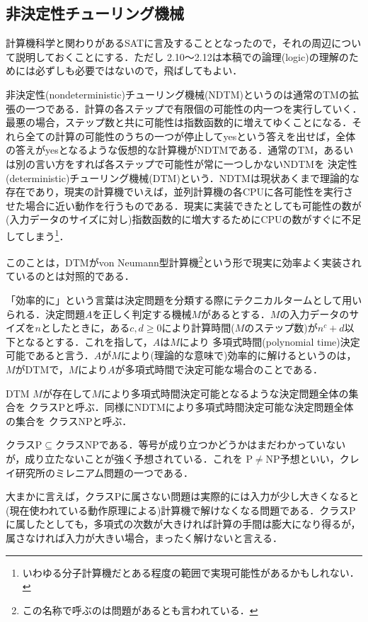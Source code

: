 \documentclass{ltjsarticle}
\theoremstyle{mystyle1}
\theoremstyle{mystyle3}
\theoremstyle{mystyle2}
\newcommand{\red}[1]{{\color{red} #1}}
\begin{document}
\subsection{非決定性チューリング機械}
計算機科学と関わりがあるSATに言及することとなったので，それの周辺について説明しておくことにする．ただし 2.10～2.12は本稿での論理(logic)の理解のためには必ずしも必要ではないので，飛ばしてもよい．

\red{非決定性}(nondeterministic)チューリング機械(NDTM)というのは通常のTMの拡張の一つである．計算の各ステップで有限個の可能性の内一つを実行していく．最悪の場合，ステップ数と共に可能性は指数函数的に増えてゆくことになる．それら全ての計算の可能性のうちの一つが停止してyesという答えを出せば，全体の答えがyesとなるような仮想的な計算機がNDTMである．通常のTM，あるいは別の言い方をすれば各ステップで可能性が常に一つしかないNDTMを\red{決定性}(deterministic)チューリング機械(DTM)という．NDTMは現状あくまで理論的な存在であり，現実の計算機でいえば，並列計算機の各CPUに各可能性を実行させた場合に近い動作を行うものである．現実に実装できたとしても可能性の数が(入力データのサイズに対し)指数函数的に増大するためにCPUの数がすぐに不足してしまう\footnote{いわゆる分子計算機だとある程度の範囲で実現可能性があるかもしれない．}．

このことは，DTMがvon Neumann型計算機\footnote{この名称で呼ぶのは問題があるとも言われている．}という形で現実に効率よく実装されているのとは対照的である．

「効率的に」という言葉は決定問題を分類する際にテクニカルタームとして用いられる．決定問題$A$を正しく判定する機械$M$があるとする．$M$の入力データのサイズを$n$としたときに，ある$c,d\geq 0$により計算時間($M$のステップ数)が$n^c + d$以下となるとする．これを指して，$A$は$M$により\red{多項式時間}(polynomial time)決定可能であると言う．$A$が$M$により(理論的な意味で)効率的に解けるというのは，$M$がDTMで，$M$により$A$が多項式時間で決定可能な場合のことである．

DTM $M$が存在して$M$により多項式時間決定可能となるような決定問題全体の集合を\red{クラスP}と呼ぶ．同様にNDTMにより多項式時間決定可能な決定問題全体の集合を\red{クラスNP}と呼ぶ．

クラスP$\subseteq$クラスNPである．等号が成り立つかどうかはまだわかっていないが，成り立たないことが強く予想されている．これを\red{P$\neq$NP予想}といい，クレイ研究所のミレニアム問題の一つである．

大まかに言えば，クラスPに属さない問題は実際的には入力が少し大きくなると(現在使われている動作原理による)計算機で解けなくなる問題である．クラスPに属したとしても，多項式の次数が大きければ計算の手間は膨大になり得るが，属さなければ入力が大きい場合，まったく解けないと言える．
\end{document}

